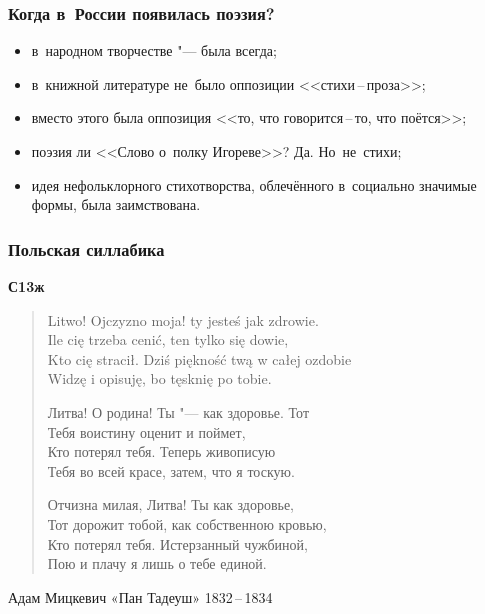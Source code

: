 \documentclass{beamer}
\begin{document}

\begin{frame}
\frametitle{Когда в~России появилась поэзия?}
\begin{itemize}
\item в~народном творчестве "--- была всегда;
\item в~книжной литературе не~было оппозиции <<стихи\,--\,проза>>;
\item вместо этого была оппозиция <<то, что говорится\,--\,то, что поётся>>;
\item поэзия ли <<Слово о~полку Игореве>>? Да. Но~не~стихи;
\item идея нефольклорного стихотворства, облечённого в~социально значимые формы, была заимствована.
\end{itemize}

\end{frame}


\begin{frame}
\frametitle{Польская силлабика}
\textbf{С13ж}

\begin{verse}
Litwo! Ojczyzno moja! ty jesteś jak zdrowie.\\
Ile cię trzeba cenić, ten tylko się \alert{dowie},\\
\alert{Kto cię stracił}. Dziś piękność twą w całej ozdobie\\
Widzę i opisuję, bo tęsknię po tobie. 

Литва! О родина! Ты "--- как здоровье. Тот\\
Тебя воистину оценит и поймет,\\
Кто потерял тебя. Теперь живописую\\
Тебя во всей красе, затем, что я тоскую.

Отчизна милая, Литва! Ты как здоровье,\\
Тот дорожит тобой, как собственною кровью,\\
Кто потерял тебя. Истерзанный чужбиной,\\
Пою и плачу я лишь о тебе единой.
\end{verse}
Адам Мицкевич «Пан Тадеуш»
1832\,--\,1834

\end{frame}
\end{document}
